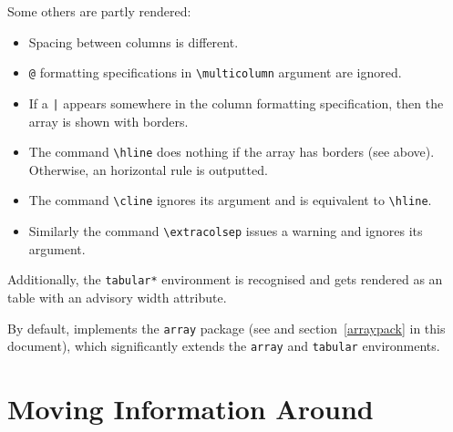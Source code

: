 Some others are partly rendered:
\begin{itemize}
\item Spacing between columns is different.
\item \verb+@+ formatting specifications in \verb+\multicolumn+
argument are ignored.
\item If a \verb+|+ appears somewhere in the column formatting
specification, then the array is shown with borders.
\item The command \verb+\hline+ does nothing if the array has borders
(see above). Otherwise, an horizontal rule is outputted.
\item The command \verb+\cline+ ignores its argument and is equivalent
to \verb+\hline+.
\item Similarly the command
\verb+\extracolsep+ issues a warning and ignores its argument.
\end{itemize}
Additionally, the \verb+tabular*+ environment is
recognised and gets rendered as an \html{} table with an advisory
width attribute.


By default, \hevea{} implements the \texttt{array} package
(see \cite[Section~5.3]{latexbis} and section~\ref{arraypack} in this
document), which significantly extends the
\verb+array+ and \verb+tabular+ environments.

\section{Moving Information Around}

